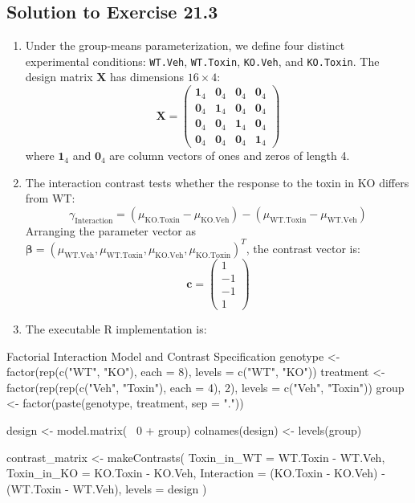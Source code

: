 \documentclass[11pt,twoside,openright]{book}
\begin{document}
\subsection*{Solution to Exercise 21.3}
\begin{enumerate}
    \item Under the group-means parameterization, we define four distinct experimental conditions: \texttt{WT.Veh}, \texttt{WT.Toxin}, \texttt{KO.Veh}, and \texttt{KO.Toxin}. The design matrix $\mathbf{X}$ has dimensions $16 \times 4$:
    $$\mathbf{X} = \begin{pmatrix}
    \mathbf{1}_4 & \mathbf{0}_4 & \mathbf{0}_4 & \mathbf{0}_4 \\
    \mathbf{0}_4 & \mathbf{1}_4 & \mathbf{0}_4 & \mathbf{0}_4 \\
    \mathbf{0}_4 & \mathbf{0}_4 & \mathbf{1}_4 & \mathbf{0}_4 \\
    \mathbf{0}_4 & \mathbf{0}_4 & \mathbf{0}_4 & \mathbf{1}_4
    \end{pmatrix}$$
    where $\mathbf{1}_4$ and $\mathbf{0}_4$ are column vectors of ones and zeros of length 4.
    \item The interaction contrast tests whether the response to the toxin in KO differs from WT:
    $$\gamma_{\text{Interaction}} = (\mu_{\text{KO.Toxin}} - \mu_{\text{KO.Veh}}) - (\mu_{\text{WT.Toxin}} - \mu_{\text{WT.Veh}})$$
    Arranging the parameter vector as $\boldsymbol{\beta} = (\mu_{\text{WT.Veh}}, \mu_{\text{WT.Toxin}}, \mu_{\text{KO.Veh}}, \mu_{\text{KO.Toxin}})^T$, the contrast vector is:
    $$\mathbf{c} = \begin{pmatrix} 1 \\ -1 \\ -1 \\ 1 \end{pmatrix}$$
    \item The executable R implementation is:
\end{enumerate}

\begin{rchunk}{Factorial Interaction Model and Contrast Specification}
genotype  <- factor(rep(c("WT", "KO"), each = 8), levels = c("WT", "KO"))
treatment <- factor(rep(rep(c("Veh", "Toxin"), each = 4), 2), levels = c("Veh", "Toxin"))
group     <- factor(paste(genotype, treatment, sep = "."))

design <- model.matrix(~ 0 + group)
colnames(design) <- levels(group)

contrast_matrix <- makeContrasts(
  Toxin_in_WT  = WT.Toxin - WT.Veh,
  Toxin_in_KO  = KO.Toxin - KO.Veh,
  Interaction  = (KO.Toxin - KO.Veh) - (WT.Toxin - WT.Veh),
  levels = design
)
\end{rchunk}
\end{document}
